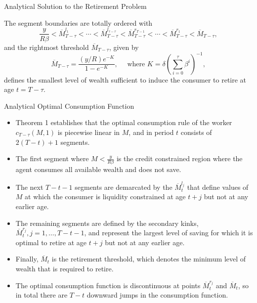 \documentclass[aspectratio=169]{beamer}
\newcommand{\highlight}[1]{{\color{red}{#1}}}
\begin{document}
\begin{frame}{Analytical Solution to the Retirement Problem}\footnotesize
	\begin{theorem}
		
		The segment boundaries are totally ordered with 
		\begin{equation}\label{8}
			\frac{y}{R\beta}<\overline{M}_{T-\tau}^{l_1}<\cdots<\overline{M}_{T-\tau}^{l_{\tau-\tau}}<\overline{M}_{T-\tau}^{r_{T-1}}<\cdots<\overline{M}_{T-\tau}^{r_1}<\overline{M}_{T-\tau},
		\end{equation}
		and the rightmost threshold $\overline{M}_{T-\tau}$, given by
		\begin{equation}
			\overline{M}_{T-\tau}=\frac{(y / R) e^{-K}}{1-e^{-K}}, \quad \text { where } K=\delta\left(\sum_{i=0}^\tau \beta^i\right)^{-1},
		\end{equation}
		defines the smallest level of wealth sufficient to induce the consumer to retire at age $t = T - \tau$.

	\end{theorem}
\end{frame}

\begin{frame}{Analytical Optimal Consumption Function}

	\begin{itemize}
		\item Theorem 1 establishes that the optimal consumption rule of the worker $c_{T-\tau}(M, 1)$ is piecewise linear in $M$, and in period $t$ consists of $2(T-t)+1$ segments. 
		\item The first segment where $M<\frac{y}{R\beta}$ is the credit constrained region where the agent consumes all available wealth and does not save.
		\item The next $T-t-1$ segments are demarcated by the \highlight{liquidity constraint kink points} $\overline{M}_t^{l_j}$ that define values of $M$ at which the consumer is liquidity constrained at age $t+j$ but not at any earlier age. 
		\item The remaining segments are defined by the secondary kinks, $\overline{M}_t^{r_j}, j=1, \ldots, T-t-1$, and represent the largest level of saving for which it is optimal to retire at age $t+j$ but not at any earlier age.
		\item Finally, $\overline{M}_t$ is the retirement threshold, which denotes the minimum level of wealth that is required to retire.
		\item The optimal consumption function is discontinuous at points $\overline{M}_t^{r_j}$ and $\overline{M}_t$, so in total there are $T - t$ downward jumps in the consumption function.

	\end{itemize}
	
\end{frame}
\end{document}
